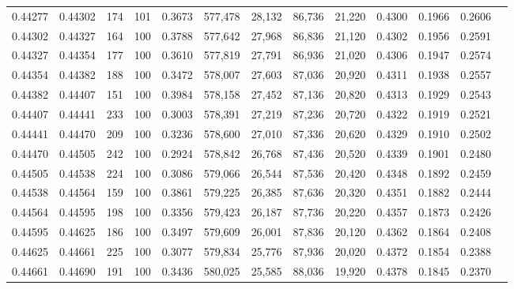 \begin{tabular}{rrrrrrrrrrrrr}
0.44277 & 0.44302 &   174 & 101 &                                     0.3673 & 577,478 &  28,132 &  86,736 &  21,220 & 0.4300 & 0.1966 & 0.2606 \\
0.44302 & 0.44327 &   164 & 100 &                                     0.3788 & 577,642 &  27,968 &  86,836 &  21,120 & 0.4302 & 0.1956 & 0.2591 \\
0.44327 & 0.44354 &   177 & 100 &                                     0.3610 & 577,819 &  27,791 &  86,936 &  21,020 & 0.4306 & 0.1947 & 0.2574 \\
0.44354 & 0.44382 &   188 & 100 &                                     0.3472 & 578,007 &  27,603 &  87,036 &  20,920 & 0.4311 & 0.1938 & 0.2557 \\
0.44382 & 0.44407 &   151 & 100 &                                     0.3984 & 578,158 &  27,452 &  87,136 &  20,820 & 0.4313 & 0.1929 & 0.2543 \\
0.44407 & 0.44441 &   233 & 100 &                                     0.3003 & 578,391 &  27,219 &  87,236 &  20,720 & 0.4322 & 0.1919 & 0.2521 \\
0.44441 & 0.44470 &   209 & 100 &                                     0.3236 & 578,600 &  27,010 &  87,336 &  20,620 & 0.4329 & 0.1910 & 0.2502 \\
0.44470 & 0.44505 &   242 & 100 &                                     0.2924 & 578,842 &  26,768 &  87,436 &  20,520 & 0.4339 & 0.1901 & 0.2480 \\
0.44505 & 0.44538 &   224 & 100 &                                     0.3086 & 579,066 &  26,544 &  87,536 &  20,420 & 0.4348 & 0.1892 & 0.2459 \\
0.44538 & 0.44564 &   159 & 100 &                                     0.3861 & 579,225 &  26,385 &  87,636 &  20,320 & 0.4351 & 0.1882 & 0.2444 \\
0.44564 & 0.44595 &   198 & 100 &                                     0.3356 & 579,423 &  26,187 &  87,736 &  20,220 & 0.4357 & 0.1873 & 0.2426 \\
0.44595 & 0.44625 &   186 & 100 &                                     0.3497 & 579,609 &  26,001 &  87,836 &  20,120 & 0.4362 & 0.1864 & 0.2408 \\
0.44625 & 0.44661 &   225 & 100 &                                     0.3077 & 579,834 &  25,776 &  87,936 &  20,020 & 0.4372 & 0.1854 & 0.2388 \\
0.44661 & 0.44690 &   191 & 100 &                                     0.3436 & 580,025 &  25,585 &  88,036 &  19,920 & 0.4378 & 0.1845 & 0.2370 \\

\end{tabular}
